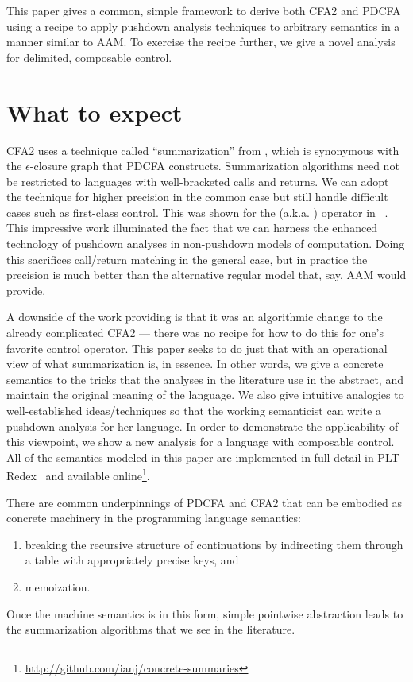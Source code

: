 \documentclass{llncs}
\newcommand{\Scribtexttt}[1]{{\texttt{#1}}}
\newcommand{\SColorize}[2]{\color{#1}{#2}}
\newcommand{\inColor}[2]{{\Scribtexttt{\SColorize{#1}{#2}}}}
\newcommand{\rackett}[1]{\inColor{black}{#1}}
\begin{document}
This paper gives a common, simple framework to derive both CFA2 and
PDCFA using a recipe to apply pushdown analysis techniques to
arbitrary semantics in a manner similar to AAM. To exercise the recipe further, 
we give a novel analysis for delimited, composable control. \\

\section{What to expect}

CFA2 uses a technique called ``summarization'' from
\citet[Chapter 7]{local:muchnick:jones:flow-analysis:1981}, which is synonymous with the
$\epsilon$-closure graph that PDCFA constructs. Summarization
algorithms need not be restricted to languages with well-bracketed
calls and returns. We can adopt the technique for higher precision in
the common case but still handle difficult cases such as first-class
control. This was shown for the
\rackett{call-with-current-continuation} (a.k.a. \rackett{call/cc})
operator in ~\citet{ianjohnson:Vardoulakis2011Pushdown}. This
impressive work illuminated the fact that we can harness the enhanced
technology of pushdown analyses in non-pushdown models of
computation. Doing this sacrifices call/return matching in the general
case, but in practice the precision is much better than the
alternative regular model that, say, AAM would provide.

A downside of the work providing \rackett{call/cc} is that it was an
algorithmic change to the already complicated CFA2 --- there was no
recipe for how to do this for one's favorite control operator. This
paper seeks to do just that with an operational view of what
summarization is, in essence. In other words, we give a concrete
semantics to the tricks that the analyses in the literature use in the
abstract, and maintain the original meaning of the language. We also
give intuitive analogies to well-established ideas/techniques so that
the working semanticist can write a pushdown analysis for her
language. In order to demonstrate the applicability of this viewpoint,
we show a new analysis for a language with composable control. All of
the semantics modeled in this paper are implemented in full detail in
PLT Redex~\citep{ianjohnson:Felleisen:2009:SEP:1795772} and available
online\footnote{\url{http://github.com/ianj/concrete-summaries}}.

There are common underpinnings of PDCFA and CFA2 that can be embodied
as concrete machinery in the programming language semantics: 
\begin{enumerate}
\item{breaking the recursive structure of continuations by indirecting them through a
table with appropriately precise keys, and}
\item{memoization.}
\end{enumerate}
Once the machine semantics is in this form, simple pointwise
abstraction leads to the summarization algorithms that we see in the
literature.
\end{document}
